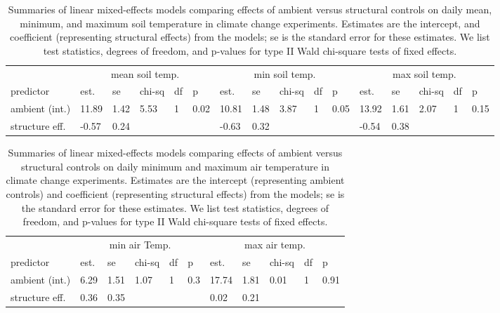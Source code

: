 \documentclass{article}
\begin{document}
\begin{table}[ht]
\centering
\caption{Summaries of linear mixed-effects models comparing effects of ambient versus structural controls on daily mean, minimum, and maximum soil temperature in climate change experiments. Estimates are the intercept, and coefficient (representing structural effects) from the models; se is the standard error for these estimates. We list test statistics, degrees of freedom, and p-values for type II Wald chi-square tests of fixed effects.} 
\label{table:shamamb_soiltemp}
\begin{tabular}{|p{}|p{}p{}p{}p{}p{}|p{}p{}p{}p{}p{}|p{}p{}p{}p{}p{}|}
  \hline
  &\multicolumn{5}{c}{mean soil temp.} &\multicolumn{5}{c}{min soil temp.} &\multicolumn{5}{c}{max soil temp.}\\
 predictor & est. & se & chi-sq & df & p & est. & se & chi-sq & df & p & est. & se & chi-sq & df & p\\
 \hline
ambient (int.) & 11.89 & 1.42 & 5.53 & 1 & 0.02 & 10.81 & 1.48 & 3.87 & 1 & 0.05 & 13.92 & 1.61 & 2.07 & 1 & 0.15 \\ 
  structure eff. & -0.57 & 0.24 &  &  &  & -0.63 & 0.32 &  &  &  & -0.54 & 0.38 &  &  &  \\ 
   \hline
\end{tabular}
\end{table}
\begin{table}[ht]
\centering
\caption{Summaries of linear mixed-effects models comparing effects of ambient versus structural controls on daily minimum and maximum air temperature in climate change experiments. Estimates are the intercept (representing ambient controls) and coefficient (representing structural effects) from the models; se is the standard error for these estimates. We list test statistics, degrees of freedom, and p-values for type II Wald chi-square tests of fixed effects.} 
\label{table:shamamb_airtemp}
\begin{tabular}{|p{}|p{}p{}p{}p{}p{}|p{}p{}p{}p{}p{}|}
  \hline
  &\multicolumn{5}{c}{min air Temp.} &\multicolumn{5}{c}{max air temp.}\\
 predictor & est. & se & chi-sq & df & p & est. & se & chi-sq & df & p\\
 \hline
ambient (int.) & 6.29 & 1.51 & 1.07 & 1 & 0.3 & 17.74 & 1.81 & 0.01 & 1 & 0.91 \\ 
  structure eff. & 0.36 & 0.35 &  &  &  & 0.02 & 0.21 &  &  &  \\ 
   \hline
\end{tabular}
\end{table}
\end{document}
